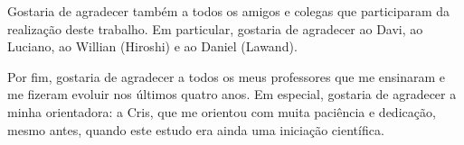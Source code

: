 \documentclass[12pt,twoside,english,brazilian]{book}
\begin{document}
    Gostaria de agradecer também a todos os amigos e colegas que
    participaram da realização deste trabalho. Em particular, gostaria
    de agradecer ao Davi, ao Luciano, ao Willian (Hiroshi) e ao Daniel
    (Lawand).

    Por fim, gostaria de agradecer a todos os meus professores que me
    ensinaram e me fizeram evoluir nos últimos quatro anos. Em especial,
    gostaria de agradecer a minha orientadora: a Cris, que me orientou
    com muita paciência e dedicação, mesmo antes, quando este estudo era
    ainda uma iniciação científica.


    



    \makeatletter
    \if@openright\cleardoublepage\else\clearpage\fi
    \makeatother


    \newcommand\disablenewpage[1]{{\let\clearpage\par\let\cleardoublepage\par #1}}

    \bgroup
    \raggedbottom
\end{document}
